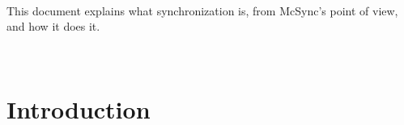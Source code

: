 \documentclass{book}
\begin{document}
~

This document explains what synchronization is,
from McSync's point of view,
and how it does it.

~






\chapter{Introduction}\label{chap:intro}
\end{document}
